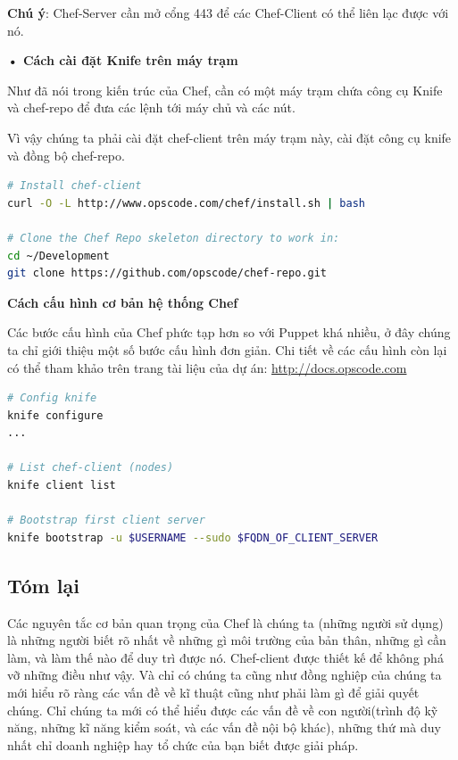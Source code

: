 \textbf{Chú ý}: Chef-Server cần mở cổng 443 để các Chef-Client có thể liên lạc được với nó.

\textbf{• Cách cài đặt Knife trên máy trạm}

Như đã nói trong kiến trúc của Chef, cần có một máy trạm chứa công cụ Knife và chef-repo để đưa các lệnh tới máy chủ và các nút.

Vì vậy chúng ta phải cài đặt chef-client trên máy trạm này, cài đặt công cụ knife và đồng bộ chef-repo.

\begin{lstlisting}[label={lst:chef_install_knife},caption={Cách cài đặt knife và chef-repo},language=bash]
# Install chef-client
curl -O -L http://www.opscode.com/chef/install.sh | bash

# Clone the Chef Repo skeleton directory to work in:
cd ~/Development
git clone https://github.com/opscode/chef-repo.git
\end{lstlisting}

\newpage
\clearpage

\textbf{\large Cách cấu hình cơ bản hệ thống Chef}

Các bước cấu hình của Chef phức tạp hơn so với Puppet khá nhiều, ở đây chúng ta chỉ giới thiệu một số bước cấu hình đơn giản. Chi tiết về các cấu hình còn lại có thể tham khảo trên trang tài liệu của dự án: \url{http://docs.opscode.com}

\begin{lstlisting}[label={lst:chef_basic_config},caption={Các bước cấu hình hệ thống Chef},language=bash]
# Config knife
knife configure
...

# List chef-client (nodes)
knife client list

# Bootstrap first client server
knife bootstrap -u $USERNAME --sudo $FQDN_OF_CLIENT_SERVER
\end{lstlisting}

\newpage
\clearpage

\subsection*{Tóm lại}

Các nguyên tắc cơ bản quan trọng của Chef là chúng ta (những người sử dụng) là những người biết rõ nhất về những gì môi trường của bản thân, những gì cần làm, và làm thế nào để duy trì được nó. Chef-client được thiết kế để không phá vỡ những điều như vậy. Và chỉ có chúng ta cũng như đồng nghiệp của chúng ta mới hiểu rõ ràng các vấn đề về kĩ thuật cũng như phải làm gì để giải quyết chúng. Chỉ chúng ta mới có thể hiểu được các vấn đề về con người(trình độ kỹ năng, những kĩ năng kiểm soát, và các vấn đề nội bộ khác), những thứ mà duy nhất chỉ doanh nghiệp hay tổ chức của bạn biết được giải pháp.

